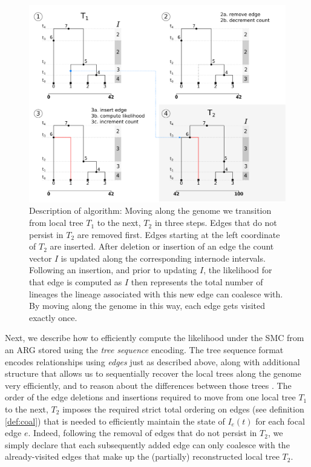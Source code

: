 \documentclass{article}
\begin{document}
\begin{figure}[!ht]
\centering
\includegraphics[width=\textwidth]{figures/ts_algo_2rows.png}
\caption{Description of algorithm: Moving along the genome we transition from
local tree $T_1$ to the next, $T_2$ in three steps. 
Edges that do not persist in $T_2$ are
removed first. Edges starting at the left coordinate of $T_2$ are inserted.
After deletion or insertion of an edge the count vector $I$ is updated along the
corresponding internode intervals. Following an insertion, and prior to updating $I$,
the likelihood for that edge is computed as $I$ then represents the total number of
lineages the lineage associated with this new edge can
coalesce with. By moving along the genome in this way, each edge gets visited exactly once.}
\label{fig:algo}
\end{figure}

Next, we describe how to efficiently compute the likelihood under the SMC
from an ARG stored using the \emph{tree sequence} encoding. %
The tree sequence format encodes relationships using \emph{edges}
just as described above,
along with additional structure that
allows us to sequentially recover the local trees
along the genome very efficiently, and to reason about
the differences between those trees \citep{kelleher_efficient_2016, ralph_efficiently_2020}.
The order of the edge deletions and insertions required to move from one local tree $T_1$ to
the next, $T_2$ imposes the required strict total ordering on edges
(see definition \ref{def:coal})
that is needed to efficiently maintain the state of $I_e(t)$ for each focal edge $e$.
Indeed, following the removal of edges that do not persist in $T_2$,
we simply declare that each subsequently added edge
can only coalesce with the already-visited edges 
that make up the (partially) reconstructed local tree $T_2$.
\end{document}

